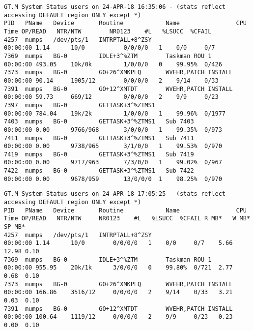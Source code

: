 \documentclass[]{article}
\begin{document}
\begin{landscape}
\lstset{
	caption=130 column output
}
\begin{lstlisting}
GT.M System Status users on 24-APR-18 16:35:06 - (stats reflect accessing DEFAULT region ONLY except *)
PID   PName   Device       Routine            Name                CPU Time OP/READ   NTR/NTW        NR0123    #L   %LSUCC  %CFAIL
4257  mumps   /dev/pts/1   INTRPTALL+8^ZSY                        00:00:00 1.14      10/0           0/0/0/0   1    0/0     0/7
7369  mumps   BG-0         IDLE+3^%ZTM        Taskman ROU 1       00:00:00 493.05    10k/0k         1/0/0/0   0    99.95%  0/426
7373  mumps   BG-0         GO+26^XMKPLQ       WVEHR,PATCH INSTALL 00:00:00 90.14     1905/12        0/0/0/0   2    9/14    0/33
7391  mumps   BG-0         GO+12^XMTDT        WVEHR,PATCH INSTALL 00:00:00 59.73     669/12         0/0/0/0   2    9/9     0/23
7397  mumps   BG-0         GETTASK+3^%ZTMS1                       00:00:00 784.04    19k/2k         1/0/0/0   1    99.96%  0/1977
7403  mumps   BG-0         GETTASK+3^%ZTMS1   Sub 7403            00:00:00 0.00      9766/968       3/0/0/0   1    99.35%  0/973
7411  mumps   BG-0         GETTASK+3^%ZTMS1   Sub 7411            00:00:00 0.00      9738/965       3/1/0/0   1    99.53%  0/970
7419  mumps   BG-0         GETTASK+3^%ZTMS1   Sub 7419            00:00:00 0.00      9717/963       7/3/0/0   1    99.02%  0/967
7422  mumps   BG-0         GETTASK+3^%ZTMS1   Sub 7422            00:00:00 0.00      9678/959       13/0/0/0  1    98.25%  0/970
\end{lstlisting}
\lstset{
	caption=$>$130 column output
}
\begin{changemargin}{-0.25in}{-0.25in}
\begin{lstlisting}
GT.M System Status users on 24-APR-18 17:05:25 - (stats reflect accessing DEFAULT region ONLY except *)
PID   PName   Device       Routine            Name                CPU Time OP/READ   NTR/NTW     NR0123    #L   %LSUCC  %CFAIL R MB*   W MB* SP MB*
4257  mumps   /dev/pts/1   INTRPTALL+8^ZSY                        00:00:00 1.14      10/0        0/0/0/0   1    0/0     0/7    5.66    12.98 0.10
7369  mumps   BG-0         IDLE+3^%ZTM        Taskman ROU 1       00:00:00 955.95    20k/1k      3/0/0/0   0    99.80%  0/721  2.77    0.68  0.10
7373  mumps   BG-0         GO+26^XMKPLQ       WVEHR,PATCH INSTALL 00:00:00 166.86    3516/12     0/0/0/0   2    9/14    0/33   3.21    0.03  0.10
7391  mumps   BG-0         GO+12^XMTDT        WVEHR,PATCH INSTALL 00:00:00 100.64    1119/12     0/0/0/0   2    9/9     0/23   0.23    0.00  0.10

\end{lstlisting}
\end{changemargin}
\end{landscape}
\end{document}

